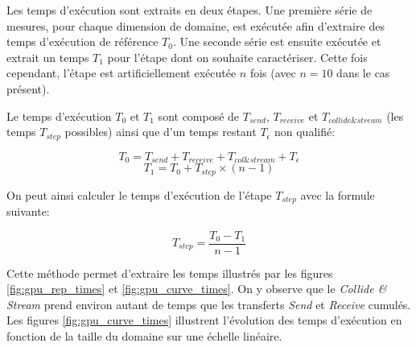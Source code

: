 Les temps d'exécution sont extraits en deux étapes. Une première série de mesures, pour chaque dimension de domaine, est exécutée afin d'extraire des temps d'exécution de référence $T_{0}$. Une seconde série est ensuite exécutée et extrait un temps $T_{1}$ pour l'étape dont on souhaite caractériser. Cette fois cependant, l'étape est artificiellement exécutée $n$ fois (avec $n=10$ dans le cas présent). 

Le temps d'exécution $T_{0}$ et $T_{1}$ sont composé de $T_{send}$, $T_{receive}$ et $T_{collide \& stream}$ (les temps $T_{step}$ possibles) ainsi que d'un temps restant $T_{\epsilon}$ non qualifié:

\begin{equation}
T_{0} = T_{send} + T_{receive} + T_{col \& stream} + T_{\epsilon}
\end{equation}
\begin{equation}
T_{1} = T_{0} + T_{step} \times (n-1)
\end{equation}

\noindent On peut ainsi calculer le temps d'exécution de l'étape $T_{step}$  avec la formule suivante:

\begin{equation}
T_{step} = \frac{T_{0} - T_{1}}{n-1}
\end{equation}

Cette méthode permet d'extraire les temps illustrés par les figures \ref{fig:gpu_rep_times} et \ref{fig:gpu_curve_times}. On y observe que le \textit{Collide \& Stream} prend environ autant de temps que les transferts \textit{Send} et \textit{Receive} cumulés. Les figures \ref{fig:gpu_curve_times} illustrent l'évolution des temps d'exécution en fonction de la taille du domaine sur une échelle linéaire.

